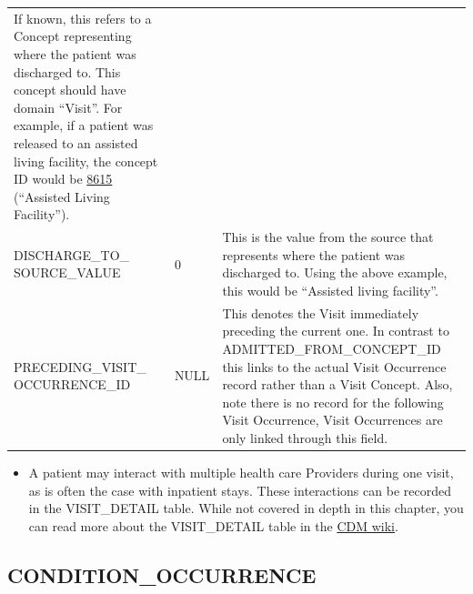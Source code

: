\documentclass[11pt]{book}
\providecommand{\tightlist}{%
  \setlength{\itemsep}{0pt}\setlength{\parskip}{0pt}}
\theoremstyle{definition}
\theoremstyle{definition}
\theoremstyle{definition}
\theoremstyle{remark}
\begin{document}
\begin{longtable}[]{@{}lll@{}}
\begin{minipage}[t]{0.49\columnwidth}
If known, this refers to a Concept representing where the patient was discharged to. This concept should have domain ``Visit''. For example, if a patient was released to an assisted living facility, the concept ID would be \href{http://athena.ohdsi.org/search-terms/terms/8615}{8615} (``Assisted Living Facility'').\strut
\end{minipage}\tabularnewline
\begin{minipage}[t]{0.28\columnwidth}\raggedright
DISCHARGE\_TO\_ SOURCE\_VALUE\strut
\end{minipage} & \begin{minipage}[t]{0.15\columnwidth}\raggedright
0\strut
\end{minipage} & \begin{minipage}[t]{0.49\columnwidth}\raggedright
This is the value from the source that represents where the patient was discharged to. Using the above example, this would be ``Assisted living facility''.\strut
\end{minipage}\tabularnewline
\begin{minipage}[t]{0.28\columnwidth}\raggedright
PRECEDING\_VISIT\_ OCCURRENCE\_ID\strut
\end{minipage} & \begin{minipage}[t]{0.15\columnwidth}\raggedright
NULL\strut
\end{minipage} & \begin{minipage}[t]{0.49\columnwidth}\raggedright
This denotes the Visit immediately preceding the current one. In contrast to ADMITTED\_FROM\_CONCEPT\_ID this links to the actual Visit Occurrence record rather than a Visit Concept. Also, note there is no record for the following Visit Occurrence, Visit Occurrences are only linked through this field.\strut
\end{minipage}\tabularnewline
\bottomrule
\end{longtable}

\begin{itemize}
\tightlist
\item
  A patient may interact with multiple health care Providers during one visit, as is often the case with inpatient stays. These interactions can be recorded in the VISIT\_DETAIL table. While not covered in depth in this chapter, you can read more about the VISIT\_DETAIL table in the \href{https://github.com/OHDSI/CommonDataModel/wiki/VISIT_DETAIL}{CDM wiki}.
\end{itemize}

\hypertarget{conditionOccurrence}{%
\subsection{CONDITION\_OCCURRENCE}\label{conditionOccurrence}}
\end{document}
